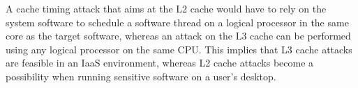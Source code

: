 A cache timing attack that aims at the L2 cache would have to rely on the
system software to schedule a software thread on a logical processor in the
same core as the target software, whereas an attack on the L3 cache can be
performed using any logical processor on the same CPU. This implies that L3
cache attacks are feasible in an IaaS environment, whereas L2 cache attacks
become a possibility when running sensitive software on a user's desktop.
